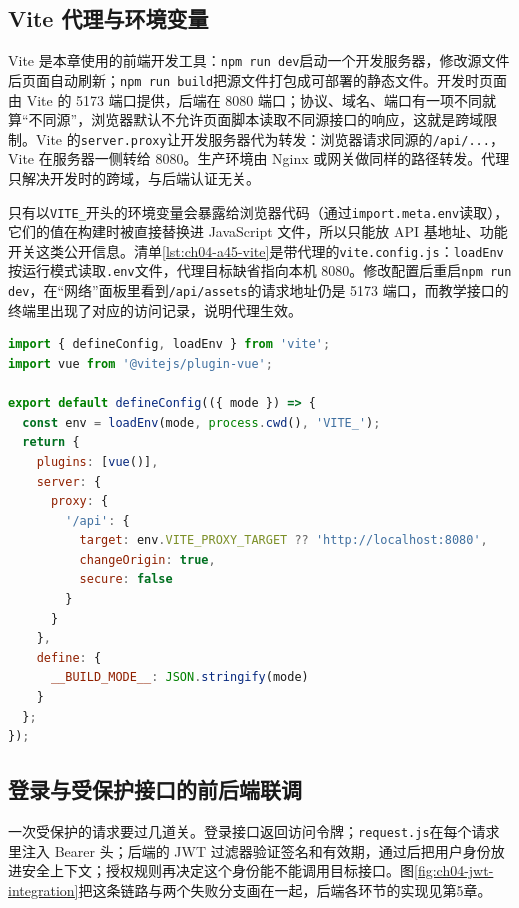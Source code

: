 \subsection{Vite 代理与环境变量}

Vite 是本章使用的前端开发工具：\texttt{npm run dev}启动一个开发服务器，修改源文件后页面自动刷新；\texttt{npm run build}把源文件打包成可部署的静态文件。开发时页面由 Vite 的 5173 端口提供，后端在 8080 端口；协议、域名、端口有一项不同就算“不同源”，浏览器默认不允许页面脚本读取不同源接口的响应，这就是跨域限制。Vite 的\texttt{server.proxy}让开发服务器代为转发：浏览器请求同源的\texttt{/api/...}，Vite 在服务器一侧转给 8080。生产环境由 Nginx 或网关做同样的路径转发。代理只解决开发时的跨域，与后端认证无关。

只有以\texttt{VITE\_}开头的环境变量会暴露给浏览器代码（通过\texttt{import.meta.env}读取），它们的值在构建时被直接替换进 JavaScript 文件，所以只能放 API 基地址、功能开关这类公开信息。清单\ref{lst:ch04-a45-vite}是带代理的\texttt{vite.config.js}：\texttt{loadEnv}按运行模式读取\texttt{.env}文件，代理目标缺省指向本机 8080。修改配置后重启\texttt{npm run dev}，在“网络”面板里看到\texttt{/api/assets}的请求地址仍是 5173 端口，而教学接口的终端里出现了对应的访问记录，说明代理生效。

\begin{lstlisting}[label={lst:ch04-a45-vite},language=JavaScript,caption={Vite 5 的 server.proxy 与 import.meta.env}]
import { defineConfig, loadEnv } from 'vite';
import vue from '@vitejs/plugin-vue';

export default defineConfig(({ mode }) => {
  const env = loadEnv(mode, process.cwd(), 'VITE_');
  return {
    plugins: [vue()],
    server: {
      proxy: {
        '/api': {
          target: env.VITE_PROXY_TARGET ?? 'http://localhost:8080',
          changeOrigin: true,
          secure: false
        }
      }
    },
    define: {
      __BUILD_MODE__: JSON.stringify(mode)
    }
  };
});
\end{lstlisting}

\subsection{登录与受保护接口的前后端联调}

一次受保护的请求要过几道关。登录接口返回访问令牌；\texttt{request.js}在每个请求里注入 Bearer 头；后端的 JWT 过滤器验证签名和有效期，通过后把用户身份放进安全上下文；授权规则再决定这个身份能不能调用目标接口。图\ref{fig:ch04-jwt-integration}把这条链路与两个失败分支画在一起，后端各环节的实现见第5章。

